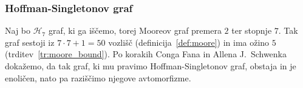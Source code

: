 \documentclass[fin1, tisk]{fmfdelo}
\newcommand{\hof}{\mathscr{H}_{7}}
\newcommand{\PPP}{\mathscr{P}_3}
\newcommand{\aut}{\operatorname{Aut}}
\begin{document}










\subsubsection{Hoffman-Singletonov graf}

Naj bo $\hof$ graf, ki ga iščemo, torej Mooreov graf premera $2$ ter stopnje $7$.
Tak graf sestoji iz $7\cdot 7 + 1 = 50$ vozlišč (definicija~\ref{def:moore}) in ima 
ožino $5$ (trditev~\ref{tr:moore_bound}).
Po korakih Conga Fana in Allena J.~Schwenka~\cite{fan1993structure} dokažemo,
da tak graf, ki mu pravimo Hoffman-Singletonov graf, obstaja in je enoličen, nato pa raziščimo njegove avtomorfizme.
\end{document}
